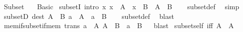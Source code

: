 %
\begin{isabellebody}%
%
%
\isadelimdocument
%
\endisadelimdocument
%
\isatagdocument
%
\isamarkuptrue%
%
\endisatagdocument
{\isafolddocument}%
%
\isadelimdocument
%
\endisadelimdocument
%
\isadelimtheory
%
\endisadelimtheory
%
\isatagtheory
{}\isamarkupfalse%
\ Subset\isanewline
\ \ \ Basic\isanewline
{}%
\endisatagtheory
{\isafoldtheory}%
%
\isadelimtheory
\isanewline
%
\endisadelimtheory
\isanewline
{}\isamarkupfalse%
\ subsetI\ {\isacharbrackleft}{\kern0pt}intro{\isacharbang}{\kern0pt}{\isacharbrackright}{\kern0pt}{\isacharcolon}{\kern0pt}\ {\isachardoublequoteopen}{\isacharparenleft}{\kern0pt}{\isasymAnd}x{\isachardot}{\kern0pt}\ x\ {\isasymin}\ A\ {\isasymLongrightarrow}\ x\ {\isasymin}\ B{\isacharparenright}{\kern0pt}\ {\isasymLongrightarrow}\ A\ {\isasymsubseteq}\ B{\isachardoublequoteclose}\isanewline
%
\isadelimproof
\ \ %
\endisadelimproof
%
\isatagproof
{}\isamarkupfalse%
\ subset{\isacharunderscore}{\kern0pt}def\ \isamarkupfalse%
\ simp%
\endisatagproof
{\isafoldproof}%
%
\isadelimproof
\isanewline
%
\endisadelimproof
\isanewline
{}\isamarkupfalse%
\ subsetD\ {\isacharbrackleft}{\kern0pt}dest{\isacharbrackright}{\kern0pt}{\isacharcolon}{\kern0pt}\ {\isachardoublequoteopen}{\isasymlbrakk}A\ {\isasymsubseteq}\ B{\isacharsemicolon}{\kern0pt}\ a\ {\isasymin}\ A{\isasymrbrakk}\ {\isasymLongrightarrow}\ a\ {\isasymin}\ B{\isachardoublequoteclose}\isanewline
%
\isadelimproof
\ \ %
\endisadelimproof
%
\isatagproof
{}\isamarkupfalse%
\ subset{\isacharunderscore}{\kern0pt}def\ \isamarkupfalse%
\ blast%
\endisatagproof
{\isafoldproof}%
%
\isadelimproof
\isanewline
%
\endisadelimproof
\isanewline
{}\isamarkupfalse%
\ mem{\isacharunderscore}{\kern0pt}if{\isacharunderscore}{\kern0pt}subset{\isacharunderscore}{\kern0pt}if{\isacharunderscore}{\kern0pt}mem\ {\isacharbrackleft}{\kern0pt}trans{\isacharbrackright}{\kern0pt}{\isacharcolon}{\kern0pt}\ {\isachardoublequoteopen}{\isasymlbrakk}a\ {\isasymin}\ A{\isacharsemicolon}{\kern0pt}\ A\ {\isasymsubseteq}\ B{\isasymrbrakk}\ {\isasymLongrightarrow}\ a\ {\isasymin}\ B{\isachardoublequoteclose}%
\isadelimproof
\ %
\endisadelimproof
%
\isatagproof
{}\isamarkupfalse%
\ blast%
\endisatagproof
{\isafoldproof}%
%
\isadelimproof
%
\endisadelimproof
\isanewline
\isanewline
{}\isamarkupfalse%
\ subset{\isacharunderscore}{\kern0pt}self\ {\isacharbrackleft}{\kern0pt}iff{\isacharbrackright}{\kern0pt}{\isacharcolon}{\kern0pt}\ {\isachardoublequoteopen}A\ {\isasymsubseteq}\ A{\isachardoublequoteclose}%

\end{isabellebody}
